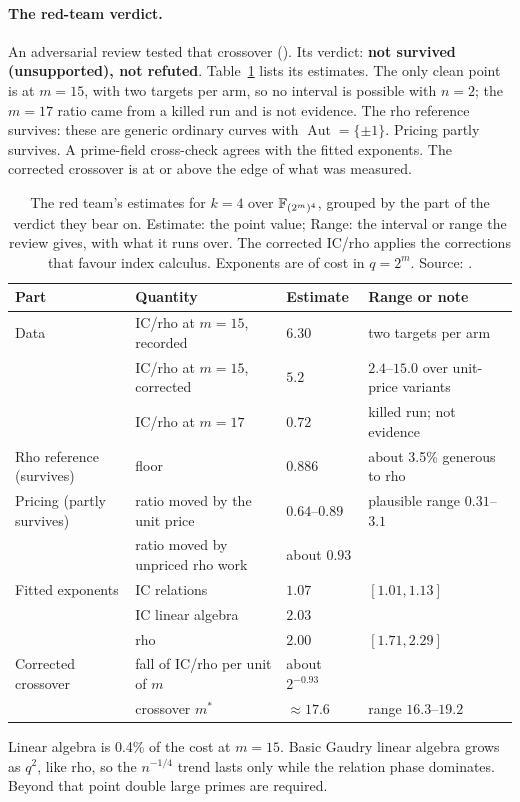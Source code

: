 \paragraph{The red-team verdict.} An adversarial review tested that
crossover (). Its
verdict: \textbf{not survived (unsupported), not refuted}.
Table~\ref{tab:extension-redteam} lists its estimates. The only clean point
is at $m=15$, with two targets per arm, so no interval is possible with
$n=2$; the $m=17$ ratio came from a killed run and is not evidence. The rho
reference survives: these are generic ordinary curves with
$\operatorname{Aut}=\{\pm1\}$. Pricing partly survives. A prime-field
cross-check agrees with the fitted exponents. The corrected crossover is
at or above the edge of what was measured.

\begin{table}[t]
\centering\small
\begin{tabularx}{\linewidth}{@{}>{\raggedright}p{2.3cm}>{\raggedright}X>{\raggedright}p{2.2cm}>{\raggedright\arraybackslash}p{4.6cm}@{}}
\toprule
Part & Quantity & Estimate & Range or note \\
\midrule
Data & IC/rho at $m=15$, recorded & $6.30$ & two targets per arm \\
 & IC/rho at $m=15$, corrected & $5.2$ & $2.4$--$15.0$ over unit-price variants \\
 & IC/rho at $m=17$ & $0.72$ & killed run; not evidence \\
\addlinespace
Rho reference (survives) & floor & $0.886$ & about 3.5\% generous to rho \\
\addlinespace
Pricing (partly survives) & ratio moved by the unit price & $0.64$--$0.89$ & plausible range $0.31$--$3.1$ \\
 & ratio moved by unpriced rho work & about $0.93$ & \\
\addlinespace
Fitted exponents & IC relations & $1.07$ & $[1.01,1.13]$ \\
 & IC linear algebra & $2.03$ & \\
 & rho & $2.00$ & $[1.71,2.29]$ \\
\addlinespace
Corrected crossover & fall of IC/rho per unit of $m$ & about $2^{-0.93}$ & \\
 & crossover $m^*$ & $\approx17.6$ & range $16.3$--$19.2$ \\
\bottomrule
\end{tabularx}
\caption[]{The red team's estimates for $k=4$ over $\mathbb{F}_{(2^m)^4}$, grouped
by the part of the verdict they bear on. Estimate: the point value; Range:
the interval or range the review gives, with what it runs over. The
corrected IC/rho applies the corrections that favour index calculus.
Exponents are of cost in $q=2^m$. Source:
.}
\label{tab:extension-redteam}
\end{table}
Linear algebra is 0.4\% of the cost at $m=15$. Basic Gaudry linear
algebra grows as $q^2$, like rho, so the $n^{-1/4}$ trend lasts only while
the relation phase dominates. Beyond that point double large primes are
required.

